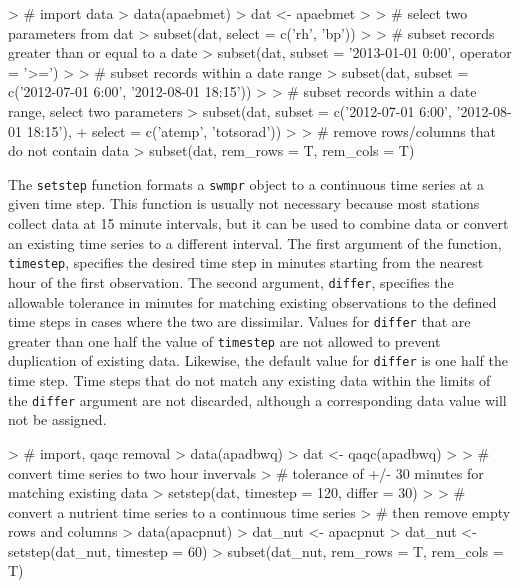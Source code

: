 \begin{example}
> # import data
> data(apaebmet)
> dat <- apaebmet
> 
> # select two parameters from dat
> subset(dat, select = c('rh', 'bp'))
> 
> # subset records greater than or equal to a date
> subset(dat, subset = '2013-01-01 0:00', operator = '>=')
> 
> # subset records within a date range
> subset(dat, subset = c('2012-07-01 6:00', '2012-08-01 18:15'))
> 
> # subset records within a date range, select two parameters
> subset(dat, subset = c('2012-07-01 6:00', '2012-08-01 18:15'),
+   select = c('atemp', 'totsorad'))
> 
> # remove rows/columns that do not contain data
> subset(dat, rem_rows = T, rem_cols = T)
\end{example}

The \texttt{setstep} function formats a \texttt{swmpr} object to a continuous time series at a given time step.  This function is usually not necessary because most stations collect data at 15 minute intervals, but it can be used to combine data or convert an existing time series to a different interval.  The first argument of the function, \texttt{timestep}, specifies the desired time step in minutes starting from the nearest hour of the first observation.  The second argument, \texttt{differ}, specifies the allowable tolerance in minutes for matching existing observations to the defined time steps in cases where the two are dissimilar.  Values for \texttt{differ} that are greater than one half the value of \texttt{timestep} are not allowed to prevent duplication of existing data.  Likewise, the default value for \texttt{differ} is one half the time step.  Time steps that do not match any existing data within the limits of the \texttt{differ} argument are not discarded, although a corresponding data value will not be assigned.

\begin{example}
> # import, qaqc removal
> data(apadbwq)
> dat <- qaqc(apadbwq)
> 
> # convert time series to two hour invervals
> # tolerance of +/- 30 minutes for matching existing data
> setstep(dat, timestep = 120, differ = 30)
> 
> # convert a nutrient time series to a continuous time series
> # then remove empty rows and columns
> data(apacpnut)
> dat_nut <- apacpnut
> dat_nut <- setstep(dat_nut, timestep = 60)
> subset(dat_nut, rem_rows = T, rem_cols = T)
\end{example}


